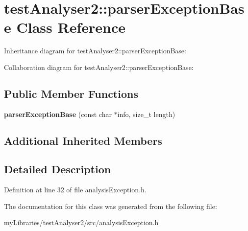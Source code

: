 \hypertarget{classtestAnalyser2_1_1parserExceptionBase}{}\section{test\+Analyser2\+::parser\+Exception\+Base Class Reference}
\label{classtestAnalyser2_1_1parserExceptionBase}


Inheritance diagram for test\+Analyser2\+::parser\+Exception\+Base\+:


Collaboration diagram for test\+Analyser2\+::parser\+Exception\+Base\+:
\subsection*{Public Member Functions}
\begin{DoxyCompactItemize}
\item 
\mbox{\label{classtestAnalyser2_1_1parserExceptionBase_a88fb7f4bb29256ac5d3fcb019e7e87bc}} 
{\bfseries parser\+Exception\+Base} (const char $\ast$info, size\+\_\+t length)
\end{DoxyCompactItemize}
\subsection*{Additional Inherited Members}


\subsection{Detailed Description}


Definition at line 32 of file analysis\+Exception.\+h.



The documentation for this class was generated from the following file\+:\begin{DoxyCompactItemize}
\item 
my\+Libraries/test\+Analyser2/src/analysis\+Exception.\+h\end{DoxyCompactItemize}
